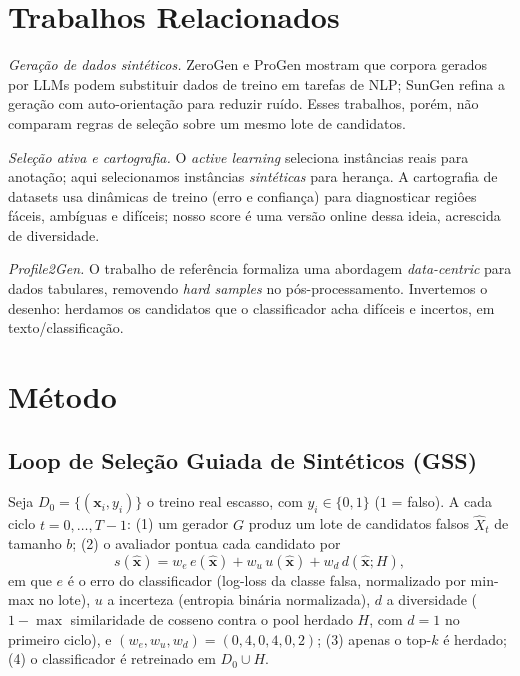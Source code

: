 \documentclass[conference]{IEEEtran}
\begin{document}
\section{Trabalhos Relacionados}

\emph{Gera\c{c}\~ao de dados sint\'eticos.} ZeroGen \cite{ye2022zerogen} e ProGen \cite{meng2022progen} mostram que corpora gerados por LLMs podem substituir dados de treino em tarefas de NLP; SunGen \cite{gao2023sungen} refina a gera\c{c}\~ao com auto-orienta\c{c}\~ao para reduzir ru\'ido. Esses trabalhos, por\'em, n\~ao comparam regras de sele\c{c}\~ao sobre um mesmo lote de candidatos.

\emph{Sele\c{c}\~ao ativa e cartografia.} O \emph{active learning} \cite{settles2009active} seleciona inst\^ancias reais para anota\c{c}\~ao; aqui selecionamos inst\^ancias \emph{sint\'eticas} para heran\c{c}a. A cartografia de datasets \cite{swayamdipta2020cartography} usa din\^amicas de treino (erro e confian\c{c}a) para diagnosticar regi\^oes f\'aceis, amb\'iguas e dif\'iceis; nosso score \'e uma vers\~ao online dessa ideia, acrescida de diversidade.

\emph{Profile2Gen.} O trabalho de refer\^encia \cite{souza2025profile2gen} formaliza uma abordagem \emph{data-centric} para dados tabulares, removendo \emph{hard samples} no p\'os-processamento. Invertemos o desenho: herdamos os candidatos que o classificador acha dif\'iceis e incertos, em texto/classifica\c{c}\~ao.

\section{M\'etodo}

\subsection{Loop de Sele\c{c}\~ao Guiada de Sint\'eticos (GSS)}

Seja $D_0 = \{(\mathbf{x}_i, y_i)\}$ o treino real escasso, com $y_i \in \{0,1\}$ ($1$ = falso). A cada ciclo $t=0,\dots,T-1$: (1) um gerador $G$ produz um lote de candidatos falsos $\hat{X}_t$ de tamanho $b$; (2) o avaliador pontua cada candidato por
\begin{equation}
s(\hat{\mathbf{x}}) = w_e\,e(\hat{\mathbf{x}}) + w_u\,u(\hat{\mathbf{x}}) + w_d\,d(\hat{\mathbf{x}}; H),
\label{eq:score}
\end{equation}
em que $e$ \'e o erro do classificador (log-loss da classe falsa, normalizado por min-max no lote), $u$ a incerteza (entropia bin\'aria normalizada), $d$ a diversidade ($1 - \max$ similaridade de cosseno contra o pool herdado $H$, com $d{=}1$ no primeiro ciclo), e $(w_e, w_u, w_d) = (0{,}4, 0{,}4, 0{,}2)$; (3) apenas o top-$k$ \'e herdado; (4) o classificador \'e retreinado em $D_0 \cup H$.
\end{document}
